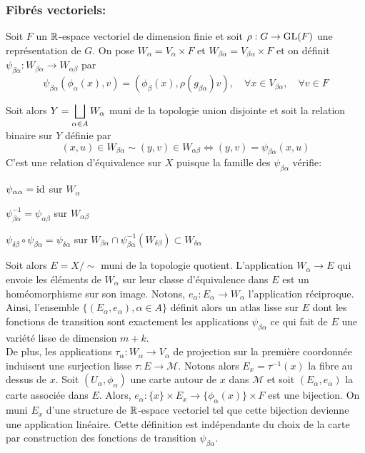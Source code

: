 \documentclass[12pt, a4paper]{book}
\begin{document}
\subsubsection{Fibrés vectoriels:}

Soit $F$ un $\mathbb{R}$-espace vectoriel de dimension finie et soit $\rho : G \to \operatorname{GL}(F)$ une représentation de $G$. On pose $W_\alpha = V_\alpha\times F$ et $W_{\beta\alpha} = V_{\beta\alpha}\times F$ et on définit $\psi_{\beta\alpha} : W_{\beta\alpha} \to W_{\alpha\beta}$ par
$$\psi_{\beta\alpha}(\phi_\alpha(x), v) = (\phi_\beta(x), \rho(g_{\beta\alpha})v), \quad \forall x\in V_{\beta\alpha}, \quad \forall v\in F$$

Soit alors $Y = \displaystyle \bigsqcup_{\alpha \in A} W_\alpha$ muni de la topologie union disjointe et soit la relation binaire sur $Y$ définie par
$$(x,u)\in W_{\beta\alpha} \sim (y, v)\in W_{\alpha\beta} \iff (y, v) = \psi_{\beta\alpha}(x, u)$$
C'est une relation d'équivalence sur $X$ puisque la famille des $\psi_{\beta\alpha}$ vérifie:
\be
	\item $\psi_{\alpha\alpha} = \operatorname{id}$ sur $W_\alpha$
	\item $\psi_{\beta\alpha}^{-1} = \psi_{\alpha\beta}$ sur $W_{\alpha\beta}$
	\item $\psi_{\delta\beta} \circ \psi_{\beta\alpha} = \psi_{\delta\alpha}$ sur $W_{\beta\alpha} \cap \psi_{\beta\alpha}^{-1}(W_{\delta\beta}) \subset W_{\delta\alpha}$ \\
\ee

Soit alors $E = X/\sim$ muni de la topologie quotient. L'application $W_\alpha \to E$ qui envoie les éléments de $W_\alpha$ sur leur classe d'équivalence dans $E$ est un homéomorphisme sur son image. Notons, $e_\alpha: E_\alpha \to W_\alpha$ l'application réciproque. \\

Ainsi, l'ensemble $\{(E_\alpha, e_\alpha), \alpha \in A\}$ définit alors un atlas lisse sur $E$ dont les fonctions de transition sont exactement les applications $\psi_{\beta\alpha}$ ce qui fait de $E$ une variété lisse de dimension $m+k$. \\

De plus, les applications $\tau_\alpha: W_\alpha \to V_\alpha$ de projection sur la première coordonnée induisent une surjection lisse $\tau: E \to \mathcal{M}$. Notons alors $E_x = \tau^{-1}(x)$ la fibre au dessus de $x$. Soit $(U_\alpha, \phi_\alpha)$ une carte autour de $x$ dans $\mathcal{M}$ et soit $(E_\alpha, e_\alpha)$ la carte associée dans $E$. Alors, $e_\alpha : \{x\}\times E_x \to \{\phi_\alpha(x)\} \times F$ est une bijection. On muni $E_x$ d'une structure de $\mathbb{R}$-espace vectoriel tel que cette bijection devienne une application linéaire. Cette définition est indépendante du choix de la carte par construction des fonctions de transition $\psi_{\beta\alpha}$. \\
\end{document}
